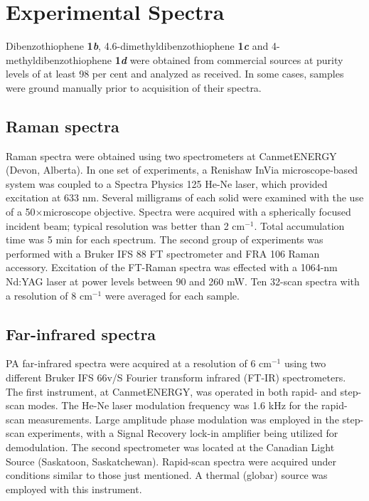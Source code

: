 	
	\section{Experimental Spectra}
	
	Dibenzothiophene \textbf{1\textit{b}}, 4.6-dimethyldibenzothiophene \textbf{1\textit{c}} and 4-methyldibenzothiophene \textbf{1\textit{d}} were obtained from commercial sources at purity levels of at least 98 per cent and analyzed as received. In some cases, samples were ground manually prior to acquisition of their spectra. 
	
	\bigskip
	
	\subsection{Raman spectra}	

	Raman spectra were obtained using two spectrometers at CanmetENERGY (Devon, Alberta). In one set of experiments, a Renishaw InVia microscope-based system was coupled to a Spectra Physics 125 He-Ne laser, which provided excitation at 633 nm. Several milligrams of each solid were examined with the use of a 50$\times$microscope objective. Spectra were acquired with a spherically focused incident beam; typical resolution was better than 2 cm$^{-1}$. Total accumulation time was 5 min for each spectrum. The second group of experiments was performed with a Bruker IFS 88 FT spectrometer and FRA 106 Raman accessory. Excitation of the FT-Raman spectra was effected with a 1064-nm Nd:YAG laser at power levels between 90 and 260 mW. Ten 32-scan spectra with a resolution of 8 cm$^{-1}$ were averaged for each sample. \\
	
	\subsection{Far-infrared spectra}
	
	\bigskip
	
	PA far-infrared spectra were acquired at a resolution of 6 cm$^{-1}$ using two different Bruker IFS 66v/S Fourier transform infrared (FT-IR) spectrometers. The first instrument, at CanmetENERGY, was operated in both rapid- and step-scan modes. The He-Ne laser modulation frequency was 1.6 kHz for the rapid-scan measurements. Large amplitude phase modulation \cite{michaelian2009far} was employed in the step-scan experiments, with a Signal Recovery lock-in amplifier being utilized for demodulation. The second spectrometer was located at the Canadian Light Source (Saskatoon, Saskatchewan). Rapid-scan spectra were acquired under conditions similar to those just mentioned. A thermal (globar) source was employed with this instrument.\\
	
